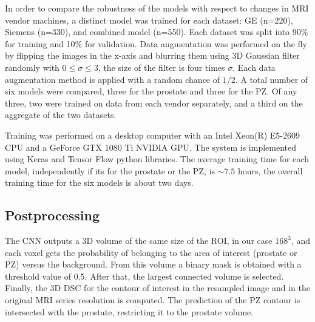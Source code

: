 In order to compare the robustness of the models with respect to changes in MRI vendor machines,  a distinct model was trained for each dataset: GE (n=220), Siemens (n=330), and combined model (n=550). Each dataset was split into 90\% for training and 10\% for validation. Data augmentation was performed on the fly by flipping the images in the x-axis and blurring them using 3D Gaussian filter randomly with $0 \leq \sigma \leq 3$, the size of the filter is four times  $\sigma$. Each data augmentation method is applied with a random chance of $1/2$.  
A total number of six models were compared, three for the prostate and three for the PZ. Of any three, two were trained on data from each vendor separately, and a third on the aggregate of the two datasets.

Training was performed on a desktop computer with an Intel Xeon(R) E5-2609 CPU and a GeForce GTX 1080 Ti NVIDIA GPU. The system is implemented using Keras \cite{chollet2015} and Tensor Flow \cite{abadi2016tensorflow} python libraries. The average training time for each model, independently if its for the prostate or the PZ, is $\sim 7.5$ hours, the overall training time for the six models is about two days.


\subsection{Postprocessing}
The CNN outputs a 3D volume of the same size of the ROI, in our case $168^3$, and each voxel gets the probability of belonging to the area of interest (prostate or PZ) versus the background. From this volume a binary mask is obtained with a threshold value of 0.5. After that, the largest connected volume is selected. Finally, the 3D DSC for the contour of interest in the resampled image and in the original MRI series resolution is computed. The prediction of the PZ contour is intersected with the prostate, restricting it to the prostate volume.
